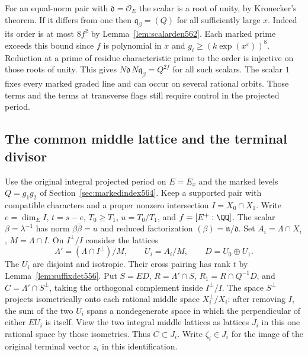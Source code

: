 \documentclass[a4paper,11pt]{article}
\theoremstyle{definition}
\theoremstyle{remark}
\numberwithin{equation}{section}
\begin{document}
For an equal-norm pair with \(\mathfrak d=\mathcal O_E\) the
scalar is a root of unity, by Kronecker's theorem. If it differs
from one then \(\mathfrak q_\beta=(Q)\) for all sufficiently
large \(x\). Indeed its order is at most \(8f^2\) by
Lemma~\ref{lem:scalarden562}. Each marked prime exceeds this
bound since \(f\) is polynomial in \(x\) and
\(g_i\ge(k\exp(x^\varepsilon))^8\). Reduction at a prime of
residue characteristic prime to the order is injective on those
roots of unity. This gives \(N\mathfrak d\,N\mathfrak q_\beta
=Q^{2f}\) for all such scalars. The scalar \(1\) fixes every
marked graded line and can occur on several rational orbits.
Those terms and the terms at transverse flags still require
control in the projected period.


\subsection{The common middle lattice and the terminal divisor}
\label{sec:commonmiddle570}

Use the original integral projected period on \(E=E_x\) and
the marked levels \(Q=g_1g_2\) of Section~\ref{sec:markedindex564}.
Keep a supported pair with compatible characters and a proper
nonzero intersection \(I=X_0\cap X_1\). Write \(e=\dim_E I\),
\(t=s-e\), \(T_0\ge T_1\), \(u=T_0/T_1\), and \(f=[E^+:\QQ]\).
The scalar \(\beta=\lambda^{-1}\) has norm \(\beta\bar\beta=u\)
and reduced factorization \((\beta)=\mathfrak n/\mathfrak d\).
Set \(A_i=\Lambda\cap X_i\), \(M=\Lambda\cap I\). On
\(I^\perp/I\) consider the lattices
\[
     \Lambda'=(\Lambda\cap I^\perp)/M,\qquad
     U_i=A_i/M,\qquad D=U_0\oplus U_1 .
\]
The \(U_i\) are disjoint and isotropic. Their cross pairing has
rank \(t\) by Lemma~\ref{lem:suffixdet556}. Put \(S=ED\),
\(R=\Lambda'\cap S\), \(R_1=R\cap Q^{-1}D\), and
\(C=\Lambda'\cap S^\perp\), taking the orthogonal complement
inside \(I^\perp/I\). The space \(S^\perp\) projects isometrically
onto each rational middle space \(X_i^\perp/X_i\): after
removing \(I\), the sum of the two \(U_i\) spans a nondegenerate
space in which the perpendicular of either \(EU_i\) is itself.
View the two integral middle lattices as lattices \(J_i\) in
this one rational space by those isometries. Thus \(C\subset J_i\).
Write \(\zeta_i\in J_i\) for the image of the original terminal
vector \(z_i\) in this identification.
\end{document}
